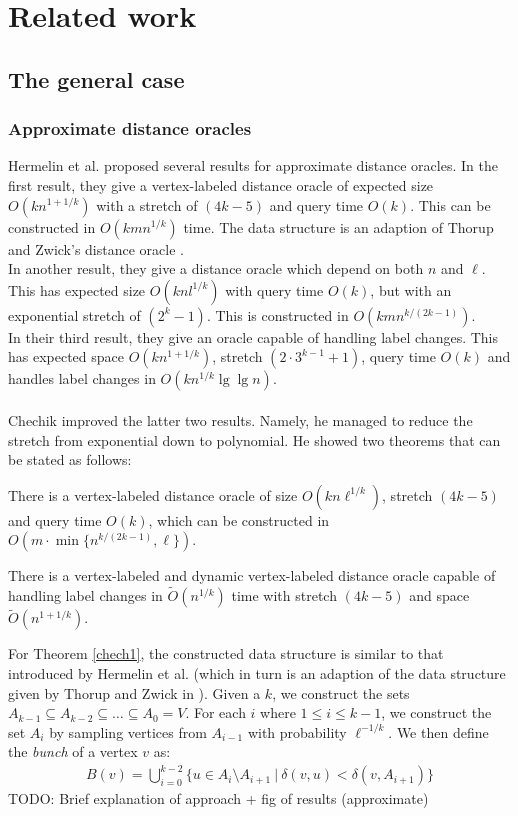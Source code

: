 \section{Related work}\label{survey}

\subsection{The general case}
\subsubsection{Approximate distance oracles}
Hermelin et al. \cite{hermelin2011distance} proposed several results for approximate
distance oracles. In the first result, they give a vertex-labeled distance oracle of
expected size $O(kn^{1+1/k})$ with a stretch of $(4k-5)$ and query time $O(k)$. This can
be constructed in $O(kmn^{1/k})$ time. The data structure is an adaption of Thorup and
Zwick's distance oracle \cite{thorup2005approximate}. \\
In another result, they give a distance oracle which depend on both $n$ and $\ell$. This has
expected size $O(knl^{1/k})$ with query time $O(k)$, but with an exponential stretch of
$(2^k-1)$. This is constructed in $O(kmn^{k/(2k-1)})$. \\
In their third result, they give an oracle capable of handling label changes. This has
expected space $O(kn^{1+1/k})$, stretch $(2\cdot3^{k-1}+1)$, query time $O(k)$ and
handles label changes in $O(kn^{1/k}\lg \lg n)$. \\
\\
Chechik \cite{chechik2012improved} improved the latter two results. Namely, he managed to
reduce the stretch from exponential down to polynomial. He showed two theorems that can
be stated as follows:
\begin{thm}\label{chech1}
  There is a vertex-labeled distance oracle
of size $O(kn\ell^{1/k})$, stretch $(4k-5)$  and query time $O(k)$, which can be
constructed in $O(m\cdot \min\{n^{k/(2k-1)}, \ell\})$.
\end{thm}
\begin{thm}\label{chech2}
  There is a vertex-labeled and dynamic vertex-labeled distance oracle capable of handling label changes in
$\tilde{O}(n^{1/k})$ time with stretch $(4k-5)$ and space $\tilde{O}(n^{1+1/k})$.
\end{thm}
For Theorem \ref{chech1}, the constructed data structure is similar to that introduced
by Hermelin et al. \cite{hermelin2011distance} (which in turn is an adaption of the data
structure given by Thorup and Zwick in \cite{thorup2005approximate}). Given a $k$, we construct the sets
$A_{k-1} \subseteq A_{k-2} \subseteq \dots \subseteq A_0=V$. For each $i$ where $1\leq i
\leq k-1$, we construct the set $A_i$ by sampling vertices from $A_{i-1}$ with
probability $\ell^{-1/k}$. We then define the \textit{bunch} of a vertex $v$ as:
\begin{align*}
  B(v)=\bigcup_{i=0}^{k-2} \{u\in A_i \setminus A_{i+1}\ |\ \delta(v,u) < \delta(v,
  A_{i+1})\}
\end{align*}
TODO: Brief explanation of approach + fig of results (approximate)

